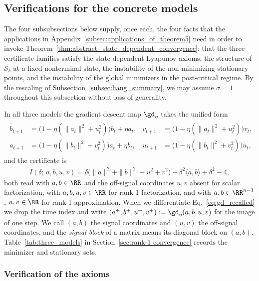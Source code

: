 \documentclass{article}
\begin{document}
\subsection{Verifications for the concrete models}
\label{subsec:concrete_verifications}

The four subsubsections below supply, once each, the four facts that the
applications in Appendix~\ref{subsec:applications_of_theorem5} need in order
to invoke Theorem~\ref{thm:abstract_state_dependent_convergence}: that the
three certificate families satisfy the state-dependent Lyapunov axioms, the
structure of
$\mathcal S_\delta$ at a fixed nonterminal state, the instability of the
non-minimizing stationary points, and the instability of the global minimizers
in the post-critical regime. By the rescaling of
Subsection~\ref{subsec:liang_summary}, we may assume $\sigma=1$ throughout this
subsection without loss of generality.

In all three models the gradient descent map $\gd_\eta$ takes the unified form
\begin{align}
\begin{aligned}
    b_{t+1} &= \bigl(1-\eta(\|a_t\|^2+u_t^2)\bigr)b_t + \eta a_t, &
    v_{t+1} &= \bigl(1-\eta(\|a_t\|^2+u_t^2)\bigr)v_t,\\
    a_{t+1} &= \bigl(1-\eta(\|b_t\|^2+v_t^2)\bigr)a_t + \eta b_t, &
    u_{t+1} &= \bigl(1-\eta(\|b_t\|^2+v_t^2)\bigr)u_t,
\end{aligned}
\label{eq:gd_recalled}
\end{align}
and the certificate is
\begin{align}
    I(\delta;\,a,b,u,v)
    =
    \delta\bigl(\|a\|^2+\|b\|^2+u^2+v^2\bigr)
    -\delta^2\langle a,b\rangle
    +\delta^2-4 ,
    \label{eq:certificate_recalled}
\end{align}
both read with $a,b\in\RR$ and the off-signal coordinates $u,v$ absent for
scalar factorization, with $a,b,u,v\in\RR$ for rank-1 factorization, and with
$a,b\in\RR^{n-1}$, $u,v\in\RR$ for rank-1 approximation. When we differentiate
Eq.~\eqref{eq:gd_recalled} we drop the time index and write
$(a^+,b^+,u^+,v^+):=\gd_\eta(a,b,u,v)$ for the image of one step. We call $(a,b)$
the signal coordinates and $(u,v)$ the off-signal coordinates, and the
\emph{signal block} of a matrix means its diagonal block on $(a,b)$.
Table~\ref{tab:three_models} in Section~\ref{sec:rank-1 convergence}
records the minimizer and stationary sets.


\subsubsection{Verification of the axioms}
\label{subsec:verification_of_axioms}
\end{document}
